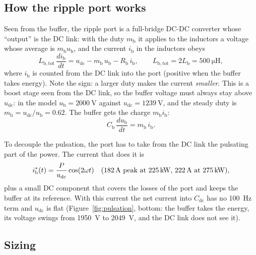 \documentclass[11pt,a4paper]{scrartcl}
\newcommand{\ped}[1]{_{\mathrm{#1}}}
\begin{document}
\begin{onehalfspace}
\subsection{How the ripple port works}

Seen from the buffer, the ripple port is a full-bridge DC-DC converter whose ``output'' is the DC link: with the duty $m\ped{b}$ it applies to the inductors a voltage whose average is $m\ped{b} u\ped{b}$, and the current $i\ped{b}$ in the inductors obeys
\begin{equation}
	L\ped{b,tot}\, \frac{d i\ped{b}}{dt} = u\ped{dc} - m\ped{b}\, u\ped{b} - R\ped{b}\, i\ped{b}, \qquad L\ped{b,tot} = 2 L\ped{b} = \SI{500}{\micro\henry},
	\label{eq:ib}
\end{equation}
where $i\ped{b}$ is counted from the DC link into the port (positive when the buffer takes energy). Note the sign: a larger duty makes the current \emph{smaller}. This is a boost stage seen from the DC link, so the buffer voltage must always stay above $u\ped{dc}$: in the model $u\ped{b} = \SI{2000}{\volt}$ against $u\ped{dc} = \SI{1239}{\volt}$, and the steady duty is $m\ped{b} = u\ped{dc}/u\ped{b} = 0.62$. The buffer gets the charge $m\ped{b} i\ped{b}$:
\begin{equation}
	C\ped{b}\, \frac{d u\ped{b}}{dt} = m\ped{b}\, i\ped{b}.
	\label{eq:ub}
\end{equation}

To decouple the pulsation, the port has to take from the DC link the pulsating part of the power. The current that does it is
\begin{equation}
	i\ped{b}^*(t) = \frac{P}{u\ped{dc}} \cos(2\omega t) \quad (\text{\SI{182}{\ampere} peak at \SI{225}{\kilo\watt}, \SI{222}{\ampere} at \SI{275}{\kilo\watt}}),
	\label{eq:ib_ref}
\end{equation}
plus a small DC component that covers the losses of the port and keeps the buffer at its reference. With this current the net current into $C\ped{dc}$ has no \SI{100}{\hertz} term and $u\ped{dc}$ is flat (Figure~\ref{fig:pulsation}, bottom: the buffer takes the energy, its voltage swings from \SI{1950}{\volt} to \SI{2049}{\volt}, and the DC link does not see it).

\subsection{Sizing}


\end{onehalfspace}
\end{document}
